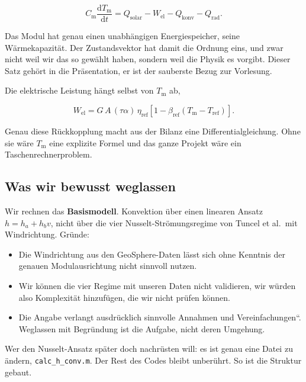 \documentclass[11pt,a4paper]{scrartcl}
\providecommand{\glqq}{\quotedblbase}
\providecommand{\grqq}{\textquotedblleft}
\newcommand{\Tm}{T_\mathrm{m}}
\newcommand{\Cm}{C_\mathrm{m}}
\begin{document}
\begin{equation}
  \Cm \frac{\mathrm{d}\Tm}{\mathrm{d}t}
    = Q_\mathrm{solar} - W_\mathrm{el} - Q_\mathrm{konv} - Q_\mathrm{rad}.
  \label{eq:bilanz}
\end{equation}

Das Modul hat genau einen unabh\"angigen Energiespeicher, seine
W\"armekapazit\"at. Der Zustandsvektor hat damit die Ordnung eins, und zwar
nicht weil wir das so gew\"ahlt haben, sondern weil die Physik es vorgibt.
Dieser Satz geh\"ort in die Pr\"asentation, er ist der sauberste Bezug zur
Vorlesung.

Die elektrische Leistung h\"angt selbst von $\Tm$ ab,

\begin{equation}
  W_\mathrm{el} = G\,A\,(\tau\alpha)\,\eta_\mathrm{ref}
     \left[1 - \beta_\mathrm{ref}(\Tm - T_\mathrm{ref})\right].
\end{equation}

Genau diese R\"uckkopplung macht aus der Bilanz eine Differentialgleichung.
Ohne sie w\"are $\Tm$ eine explizite Formel und das ganze Projekt w\"are
ein Taschenrechnerproblem.

\subsection*{Was wir bewusst weglassen}

Wir rechnen das \textbf{Basismodell}. Konvektion \"uber einen linearen Ansatz
$h = h_a + h_b v$, nicht \"uber die vier Nusselt-Str\"omungsregime von Tuncel
et al.\ mit Windrichtung. Gr\"unde:

\begin{itemize}
  \item Die Windrichtung aus den GeoSphere-Daten l\"asst sich ohne Kenntnis der
        genauen Modulausrichtung nicht sinnvoll nutzen.
  \item Wir k\"onnen die vier Regime mit unseren Daten nicht validieren, wir
        w\"urden also Komplexit\"at hinzuf\"ugen, die wir nicht pr\"ufen k\"onnen.
  \item Die Angabe verlangt ausdr\"ucklich \glqq sinnvolle Annahmen und
        Vereinfachungen\grqq. Weglassen mit Begr\"undung ist die Aufgabe, nicht
        deren Umgehung.
\end{itemize}

\begin{merke}
Wer den Nusselt-Ansatz sp\"ater doch nachr\"usten will: es ist genau eine
Datei zu \"andern, \texttt{calc\_h\_conv.m}. Der Rest des Codes bleibt
unber\"uhrt. So ist die Struktur gebaut.
\end{merke}
\end{document}
